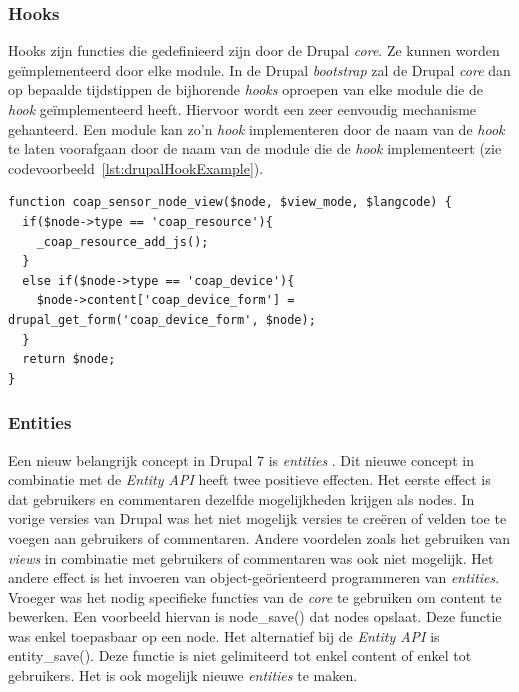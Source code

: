 \subsubsection{Hooks}
Hooks zijn functies die gedefinieerd zijn door de Drupal \textit{core}. Ze kunnen worden ge\"{i}mplementeerd door elke module. In de Drupal \textit{bootstrap} zal de Drupal \textit{core} dan op bepaalde tijdstippen de bijhorende \textit{hooks} oproepen van elke module die de \textit{hook} ge\"{i}mplementeerd heeft. Hiervoor wordt een zeer eenvoudig mechanisme gehanteerd. Een module kan zo'n \textit{hook} implementeren door de naam van de \textit{hook} te laten voorafgaan door de naam van de module die de \textit{hook} implementeert (zie codevoorbeeld~\ref{lst:drupalHookExample}).\\

\scriptsize
\lstset{language=PHP}
\begin{lstlisting}[label=lst:drupalHookExample,caption=Implementatie van hook\_node\_view door de module coap\_sensor]
function coap_sensor_node_view($node, $view_mode, $langcode) {
  if($node->type == 'coap_resource'){
    _coap_resource_add_js();
  }
  else if($node->type == 'coap_device'){
    $node->content['coap_device_form'] = drupal_get_form('coap_device_form', $node);
  }
  return $node;
}
\end{lstlisting}
\normalsize

\subsubsection{Entities}
Een nieuw belangrijk concept in Drupal 7 is \textit{entities} \cite{entities}. Dit nieuwe concept in combinatie met de \textit{Entity API} heeft twee positieve effecten. Het eerste effect is dat gebruikers en commentaren dezelfde mogelijkheden krijgen als nodes. In vorige versies van Drupal was het niet mogelijk versies te cre\"{e}ren of velden toe te voegen aan gebruikers of commentaren. Andere voordelen zoals het gebruiken van \textit{views} in combinatie met gebruikers of commentaren was ook niet mogelijk. Het andere effect is het invoeren van object-ge\"{o}rienteerd programmeren van \textit{entities}. Vroeger was het nodig specifieke functies van de \textit{core} te gebruiken om content te bewerken. Een voorbeeld hiervan is node\_save() dat nodes opslaat. Deze functie was enkel toepasbaar op een node. Het alternatief bij de \textit{Entity API} is entity\_save(). Deze functie is niet gelimiteerd tot enkel content of enkel tot gebruikers.
Het is ook mogelijk nieuwe \textit{entities} te maken. %

